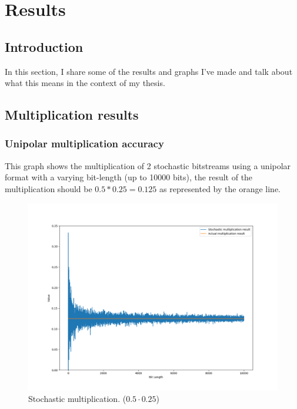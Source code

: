\documentclass[a4paper,oneside,phd,etd]{BYUPhys}
\begin{document}
\chapter{Results}

\section{Introduction}
In this section, I share some of the results and graphs I've made and talk about what this means in the context of my thesis.

\section{Multiplication results}
\subsection{Unipolar multiplication accuracy}
This graph shows the multiplication of 2 stochastic bitstreams using a unipolar format with a varying bit-length (up to 10000 bits), the result of the multiplication should be $0.5*0.25=0.125$ as represented by the orange line.
\begin{figure}[H]
\centering
\includegraphics[scale=0.4]{results/mult.png}
\caption{Stochastic multiplication. ($0.5\cdot 0.25$)}
\label{fig:mult}
\end{figure}
\end{document}
